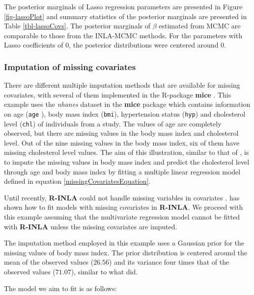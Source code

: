 \documentclass[
]{article}
\begin{document}
The posterior marginals of Lasso regression parameters are presented in
Figure \ref{fig-lassoPlot} and summary statistics of the posterior
marginals are presented in Table \ref{tbl-lassoCovs}. The posterior
marginals of \(\beta\) estimated from MCMC are comparable to those from
the INLA-MCMC methods. For the parameters with Lasso coefficients of
\(0\), the posterior distributions were centered around \(0\).

\hypertarget{imputation-of-missing-covariates}{%
\subsubsection{Imputation of missing
covariates}\label{imputation-of-missing-covariates}}

There are different multiple imputation methods that are available for
missing covariates, with several of them implemented in the R-package
\textbf{mice} \citep{van2011mice}. This example uses the \textit{nhanes}
dataset in the \textbf{mice} package which contains information on age
(\texttt{age} ), body mass index (\texttt{bmi}), hypertension status
(\texttt{hyp}) and cholesterol level (\texttt{chl}) of individuals from
a study. The values of age are completely observed, but there are
missing values in the body mass index and cholesterol level. Out of the
nine missing values in the body mass index, six of them have missing
cholesterol level values. The aim of this illustration, similar to that
of \citet{gomez2018markov}, is to impute the missing values in body mass
index and predict the cholesterol level through age and body mass index
by fitting a multiple linear regression model defined in equation
\eqref{missingCovariatesEquation}.

Until recently, \textbf{R-INLA} could not handle missing variables in
covariates \citep{gomez2018markov, berild2022importance}.
\cite{skarstein2023joint} has shown how to fit models with missing
covariates in \textbf{R-INLA}. We proceed with this example assuming
that the multivariate regression model cannot be fitted with
\textbf{R-INLA} unless the missing covariates are imputed.

The imputation method employed in this example uses a Gaussian prior for
the missing values of body mass index. The prior distribution is
centered around the mean of the observed values (\(26.56\)) and its
variance four times that of the observed values (\(71.07\)), similar to
what \citet{gomez2018markov} did.

The model we aim to fit is as follows:
\end{document}
